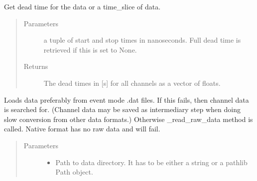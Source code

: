 \documentclass[letterpaper,10pt,english]{sphinxmanual}
\begin{document}
\begin{fulllineitems}
\begin{fulllineitems}
\label{\detokenize{autodocs/data:listmode.data.Data.get_dead_time}}
\sphinxAtStartPar
Get dead time for the data or a time\_slice of data.
\begin{quote}\begin{description}
\item[{Parameters}] \leavevmode
\sphinxAtStartPar
{} \textendash{} a tuple of start and stop times in nanoseconds. Full dead time is retrieved if this is set to
None.

\item[{Returns}] \leavevmode
\sphinxAtStartPar
The dead times in {[}s{]} for all channels as a vector of floats.

\end{description}\end{quote}

\end{fulllineitems}


\begin{fulllineitems}
\label{\detokenize{autodocs/data:listmode.data.Data.get_end_time}}
\end{fulllineitems}


\begin{fulllineitems}
\label{\detokenize{autodocs/data:listmode.data.Data.load_data}}
\sphinxAtStartPar
Loads data preferably from event mode .dat files. If this fails, then channel data is searched for. (Channel
data may be saved as intermediary step when doing slow conversion from other data formats.) Otherwise
\_read\_raw\_data method is called. Native format has no raw data and will fail.
\begin{quote}\begin{description}
\item[{Parameters}] \leavevmode\begin{itemize}
\item {} 
\sphinxAtStartPar
{} \textendash{} Path to data directory. It has to be either a string or a pathlib Path object.


\end{itemize}
\end{description}
\end{quote}
\end{fulllineitems}
\end{fulllineitems}
\end{document}

